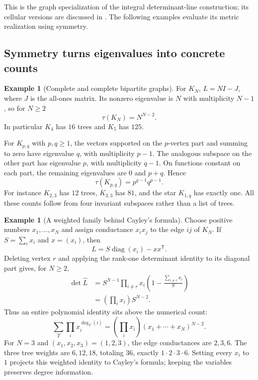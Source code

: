 \documentclass[11pt]{article}
\theoremstyle{definition}
\newtheorem{example}[theorem]{Example}
\theoremstyle{remark}
\begin{document}
This is the graph specialization of the integral determinant-line construction; its cellular versions are discussed in \cite{glinDKM2016}. The following examples evaluate its metric realization using symmetry.

\subsection{Symmetry turns eigenvalues into concrete counts}

\begin{example}[Complete and complete bipartite graphs]\label{ex:glin-complete}
For $K_N$, $L=NI-J$, where $J$ is the all-ones matrix. Its nonzero eigenvalue is $N$ with multiplicity $N-1$, so for $N\ge2$
\[
 \tau(K_N)=N^{N-2}.
\]
In particular $K_4$ has $16$ trees and $K_5$ has $125$.

For $K_{p,q}$ with $p,q\ge1$, the vectors supported on the $p$-vertex part and summing to zero have eigenvalue $q$, with multiplicity $p-1$. The analogous subspace on the other part has eigenvalue $p$, with multiplicity $q-1$. On functions constant on each part, the remaining eigenvalues are $0$ and $p+q$. Hence
\[
 \tau(K_{p,q})=p^{q-1}q^{p-1}.
\]
For instance $K_{2,3}$ has $12$ trees, $K_{3,3}$ has $81$, and the star $K_{1,q}$ has exactly one. All these counts follow from four invariant subspaces rather than a list of trees.
\end{example}

\begin{example}[A weighted family behind Cayley's formula]\label{ex:glin-weighted-cayley}
Choose positive numbers $x_1,\ldots,x_N$ and assign conductance $x_ix_j$ to the edge $ij$ of $K_N$. If $S=\sum_i x_i$ and $x=(x_i)$, then
\[
 L=S\operatorname{diag}(x_i)-xx^{\mathsf T}.
\]
Deleting vertex $r$ and applying the rank-one determinant identity to its diagonal part gives, for $N\ge2$,
\begin{align*}
 \det\widehat L
 &=S^{N-1}\prod_{i\ne r}x_i
 \left(1-\frac{\sum_{i\ne r}x_i}{S}\right)\\
 &=\left(\prod_i x_i\right)S^{N-2}.
\end{align*}
Thus an entire polynomial identity sits above the numerical count:
\[
 \sum_T\prod_i x_i^{\deg_T(i)}
 =\left(\prod_i x_i\right)(x_1+\cdots+x_N)^{N-2}.
\]
For $N=3$ and $(x_1,x_2,x_3)=(1,2,3)$, the edge conductances are $2,3,6$. The three tree weights are $6,12,18$, totaling $36$, exactly $1\cdot2\cdot3\cdot6$. Setting every $x_i$ to $1$ projects this weighted identity to Cayley's formula; keeping the variables preserves degree information.
\end{example}
\end{document}

